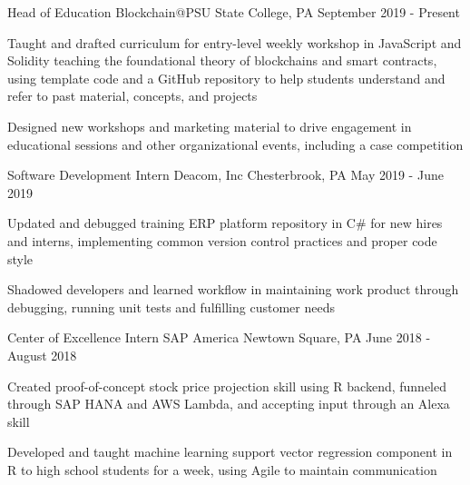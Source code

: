 
\begin{cventries}
  \cventry
    {Head of Education} %
    {Blockchain@PSU} %
    {State College, PA} %
    {September 2019 - Present} %
    {
      \begin{cvitems} %
        \item {Taught and drafted curriculum for entry-level weekly workshop in JavaScript and Solidity teaching the foundational theory of blockchains and smart contracts, using template code and a GitHub repository to help students understand and refer to past material, concepts, and projects}
        \item {Designed new workshops and marketing material to drive engagement in educational sessions and other organizational events, including a case competition}
      \end{cvitems}
    }

  \cventry
    {Software Development Intern} %
    {Deacom, Inc} %
    {Chesterbrook, PA} %
    {May 2019 - June 2019} %
    {
      \begin{cvitems} %
        \item {Updated and debugged training ERP platform repository in C\# for new hires and interns, implementing common version control practices and proper code style}
        \item {Shadowed developers and learned workflow in maintaining work product through debugging, running unit tests and fulfilling customer needs}
      \end{cvitems}
    }

  \cventry
    {Center of Excellence Intern} %
    {SAP America} %
    {Newtown Square, PA} %
    {June 2018 - August 2018} %
    {
      \begin{cvitems} %
        \item {Created proof-of-concept stock price projection skill using R backend, funneled through SAP HANA and AWS Lambda, and accepting input through an Alexa skill}
        \item {Developed and taught machine learning support vector regression component in R to high school students for a week, using Agile to maintain communication}
      \end{cvitems}
    }
\end{cventries}
